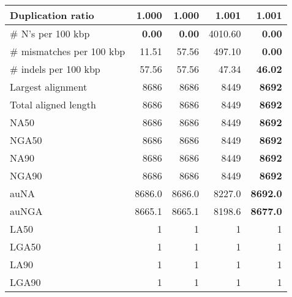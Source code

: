 \documentclass[12pt,a4paper]{article}
\begin{document}
\begin{table}[ht]
\begin{center}
\begin{tabular}{|l*{4}{|r}|}
Duplication ratio & {\bf 1.000} & {\bf 1.000} & 1.001 & 1.001 \\ \hline
\# N's per 100 kbp & {\bf 0.00} & {\bf 0.00} & 4010.60 & {\bf 0.00} \\ \hline
\# mismatches per 100 kbp & 11.51 & 57.56 & 497.10 & {\bf 0.00} \\ \hline
\# indels per 100 kbp & 57.56 & 57.56 & 47.34 & {\bf 46.02} \\ \hline
Largest alignment & 8686 & 8686 & 8449 & {\bf 8692} \\ \hline
Total aligned length & 8686 & 8686 & 8449 & {\bf 8692} \\ \hline
NA50 & 8686 & 8686 & 8449 & {\bf 8692} \\ \hline
NGA50 & 8686 & 8686 & 8449 & {\bf 8692} \\ \hline
NA90 & 8686 & 8686 & 8449 & {\bf 8692} \\ \hline
NGA90 & 8686 & 8686 & 8449 & {\bf 8692} \\ \hline
auNA & 8686.0 & 8686.0 & 8227.0 & {\bf 8692.0} \\ \hline
auNGA & 8665.1 & 8665.1 & 8198.6 & {\bf 8677.0} \\ \hline
LA50 & 1 & 1 & 1 & 1 \\ \hline
LGA50 & 1 & 1 & 1 & 1 \\ \hline
LA90 & 1 & 1 & 1 & 1 \\ \hline
LGA90 & 1 & 1 & 1 & 1 \\ \hline
\end{tabular}
\end{center}
\end{table}
\end{document}
